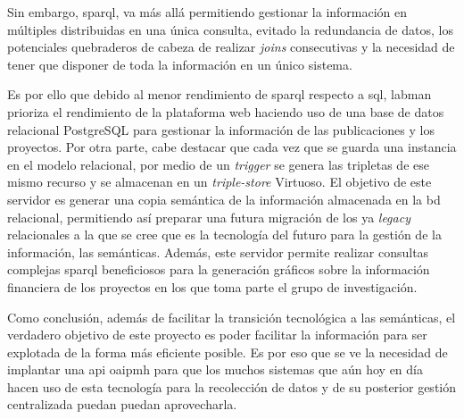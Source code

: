 Sin embargo, \acrshort{sparql}, va más allá permitiendo gestionar la información en múltiples  distribuidas en una única consulta, evitado la redundancia de datos, los potenciales quebraderos de cabeza de realizar \textit{joins} consecutivas y la necesidad de tener que disponer de toda la información en un único sistema.

Es por ello que debido al menor rendimiento de \acrshort{sparql} respecto a \acrshort{sql}, \acrshort{labman} prioriza el rendimiento de la plataforma web haciendo uso de una base de datos relacional PostgreSQL\cite{PostgreSQL} para gestionar la información de las publicaciones y los proyectos. Por otra parte, cabe destacar que cada vez que se guarda una instancia en el modelo relacional, por medio de un \textit{trigger} se genera las tripletas de ese mismo recurso y se almacenan en un \textit{triple-store} Virtuoso\cite{Virtuoso}. El objetivo de este servidor es generar una copia semántica de la información almacenada en la \acrshort{bd} relacional, permitiendo así preparar una futura migración  de los ya \textit{legacy}  relacionales a la que se cree que es la tecnología del futuro para la gestión de la información, las  semánticas. Además, este servidor permite realizar consultas complejas \acrshort{sparql} beneficiosos para la generación gráficos sobre la información financiera de los proyectos en los que toma parte el grupo de investigación.

Como conclusión, además de facilitar la transición tecnológica a las  semánticas, el verdadero objetivo de este proyecto es poder facilitar la información para ser explotada de la forma más eficiente posible. Es por eso que se ve la necesidad de implantar una \acrfull{api} \acrshort{oaipmh} para que los muchos sistemas que aún hoy en día hacen uso de esta tecnología para la recolección de datos y de su posterior gestión centralizada puedan puedan aprovecharla.
